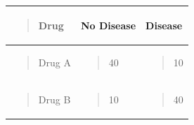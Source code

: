 {\def\LTcaptype{none} %
\begin{longtable}[]{@{}
  >{\raggedright\arraybackslash}p{}
  >{\raggedright\arraybackslash}p{}
  >{\raggedright\arraybackslash}p{}@{}}
\toprule\noalign{}
\begin{minipage}[b]{\linewidth}\raggedright
\begin{quote}
\textbf{Drug}
\end{quote}
\end{minipage} & \begin{minipage}[b]{\linewidth}\raggedright
\textbf{No Disease}
\end{minipage} & \begin{minipage}[b]{\linewidth}\raggedright
\textbf{Disease}
\end{minipage} \\
\midrule\noalign{}
\endhead
\bottomrule\noalign{}
\endlastfoot
\begin{minipage}[t]{\linewidth}\raggedright
\begin{quote}
Drug A
\end{quote}
\end{minipage} & \begin{minipage}[t]{\linewidth}\raggedright
\begin{quote}
40
\end{quote}
\end{minipage} & \begin{minipage}[t]{\linewidth}\raggedright
\begin{quote}
10
\end{quote}
\end{minipage} \\
\begin{minipage}[t]{\linewidth}\raggedright
\begin{quote}
Drug B
\end{quote}
\end{minipage} & \begin{minipage}[t]{\linewidth}\raggedright
\begin{quote}
10
\end{quote}
\end{minipage} & \begin{minipage}[t]{\linewidth}\raggedright
\begin{quote}
40
\end{quote}
\end{minipage} \\

\end{longtable}}
